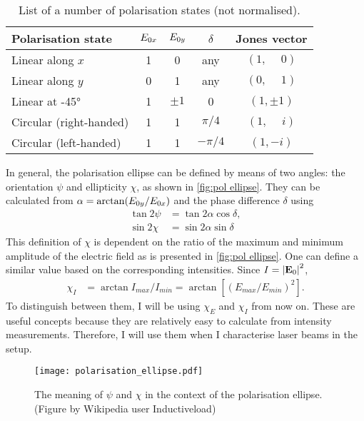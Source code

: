 \begin{table}
	\centering
	\begin{tabular}{lcccc}
		\toprule
		Polarisation state      & $ E_{0x} $ & $ E_{0y} $ & $ \delta $ &     Jones vector      \\ \midrule
		Linear along $ x $      &    1     &    0     &    any     & $ (1, \phantom{-}0) $ \\
		Linear along $ y $      &    0     &    1     &    any     & $ (0, \phantom{-}1) $ \\
		Linear at \ang{+-45}    &    1     & $ \pm1 $ &     0      &     $ (1, \pm1) $     \\
		Circular (right-handed) &    1     &    1     & $ \pi/4 $  & $ (1, \phantom{-}i) $ \\
		Circular (left-handed)  &    1     &    1     & $ -\pi/4 $ &      $ (1, -i) $      \\ \bottomrule
	\end{tabular}
	\caption{List of a number of polarisation states (not normalised).}
	\label{tab:polarisation states}
\end{table}


In general, the polarisation ellipse can be defined by means of two angles: the orientation $ \psi $ and ellipticity $ \chi $, as shown in \autoref{fig:pol ellipse}. They can be calculated from $ \alpha = \arctan(E_{0y}/E_{0x}) $ and the phase difference $ \delta $ using
\begin{align}
	\tan 2\psi &= \tan 2\alpha \cos \delta,\\
	\sin 2\chi &= \sin 2\alpha \sin \delta
\end{align}
This definition of $ \chi $ is dependent on the ratio of the maximum and minimum amplitude of the electric field as is presented in \autoref{fig:pol ellipse}. One can define a similar value based on the corresponding intensities. Since $ I = \abs{\vb{E}_0}^2 $,
\begin{align}
	\chi_I &= \arctan {I_\mathit{max}}/{I_\mathit{min}} = \arctan\left[ \left( {E_\mathit{max}}/{E_\mathit{min}} \right)^2 \right] .
\end{align}
To distinguish between them, I will be using $ \chi_E $ and $ \chi_I $ from now on. These are useful concepts because they are relatively easy to calculate from intensity measurements. Therefore, I will use them when I characterise laser beams in the setup.

\begin{figure}
	\centering
	\texttt{[image: polarisation\_ellipse.pdf]}
	\caption{The meaning of $ \psi $ and $ \chi $ in the context of the polarisation ellipse. (Figure by Wikipedia user Inductiveload)}
	\label{fig:pol ellipse}
\end{figure}

